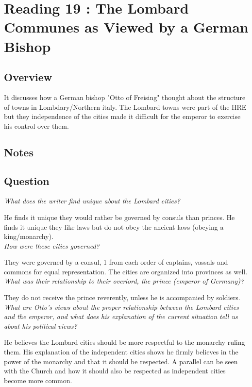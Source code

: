 \documentclass[12pt]{article}
\begin{document}
{\section*{Reading 19 : The Lombard Communes as Viewed by a German Bishop}

\subsection*{Overview}

It discusses how a German bishop "Otto of Freising" thought about the structure of towns in Lombdary/Northern italy. The Lombard towns were part of the HRE but they independence of the cities made it difficult for the emperor to exercise his control over them. 

\subsection*{Notes}

\subsection*{Question}

\textit{What does the writer find unique about the Lombard cities?}

He finds it unique they would rather be governed by consuls than princes. He finds it unique they like laws but do not obey the ancient laws (obeying a king/monarchy).\\

\textit{How were these cities governed?}

They were governed by a consul, 1 from each order of captains, vassals and commons for equal representation. The cities are organized into provinces as well.\\

\textit{What was their relationship to their overlord, the prince (emperor of Germany)?}

They do not receive the prince reverently, unless he is accompanied by soldiers.\\

\textit{What are Otto's views about the proper relationship between the Lombard cities and the emperor, and what does his explanation of the current situation tell us about his political views?}

He believes the Lombard cities should be more respectful to the monarchy ruling them. His explanation of the independent cities shows he firmly believes in the power of the monarchy and that it should be respected. A parallel can be seen with the Church and how it should also be respected as independent cities become more common.\\

}
\end{document}
